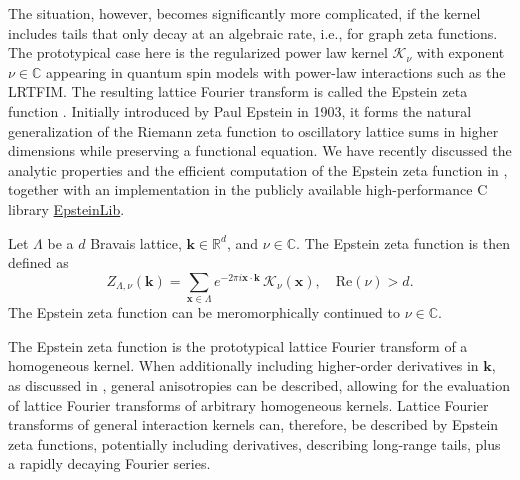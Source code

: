 \documentclass[]{amsart}
\numberwithin{mythm}{section}
\begin{document}
The situation, however, becomes significantly more complicated, if the kernel includes tails that only decay at an algebraic rate, i.e., for graph zeta functions.
The prototypical case here is the regularized power law kernel $\mathcal K_\nu$ with exponent $\nu\in \mathds C$ appearing in quantum spin models with power-law interactions such as the LRTFIM.  The resulting lattice Fourier transform is called the Epstein zeta function \cite{epstein1903theorieI,epstein1903theorieII}.
Initially introduced by Paul Epstein in 1903, it forms the natural generalization of the Riemann zeta function to oscillatory lattice sums in higher dimensions  while preserving a functional equation. We have recently discussed the analytic properties and the efficient computation of the Epstein zeta function in \cite{buchheit2024epstein}, together with an implementation in the publicly available high-performance C library \href{https://github.com/epsteinlib/epsteinlib/epsteinlib}{EpsteinLib}.
\begin{definition}
\label{def:epstein}
    Let $\Lambda$ be a $d$ Bravais lattice, $\bm k\in \mathds R^d$, and $\nu\in \mathds C$. The Epstein zeta function is then defined as
    \[
    Z_{\Lambda,\nu}(\bm k) = \sum_{\bm x\in \Lambda} e^{-2\pi i \bm x\cdot \bm k}\,\mathcal K_\nu(\bm x),\quad \mathrm{Re}(\nu)>d.
    \]
    The Epstein zeta function can be meromorphically continued to $\nu\in \mathds C$.
\end{definition}
The Epstein zeta function is the prototypical lattice Fourier transform of a homogeneous kernel. When additionally including higher-order derivatives in $\bm k$, as discussed in \cite{buchheit2026zeta}, general anisotropies can be described, allowing for the evaluation of lattice Fourier transforms of arbitrary homogeneous kernels. Lattice Fourier transforms of general interaction kernels can, therefore, be described by Epstein zeta functions, potentially including derivatives, describing long-range tails, plus a rapidly decaying Fourier series. 
\end{document}
